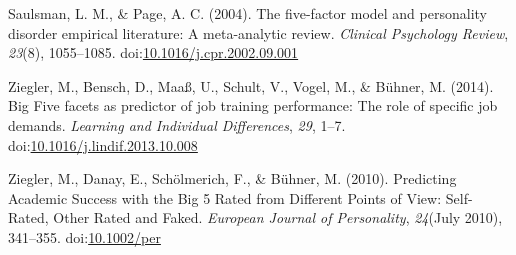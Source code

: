 \documentclass[man]{apa6}
\theoremstyle{definition}
\theoremstyle{definition}
\theoremstyle{definition}
\theoremstyle{remark}
\begin{document}
\leavevmode\hypertarget{ref-SaulsmanPage2004}{}%
Saulsman, L. M., \& Page, A. C. (2004). The five-factor model and
personality disorder empirical literature: A meta-analytic review.
\emph{Clinical Psychology Review}, \emph{23}(8), 1055--1085.
doi:\href{https://doi.org/10.1016/j.cpr.2002.09.001}{10.1016/j.cpr.2002.09.001}

\leavevmode\hypertarget{ref-Ziegler2014}{}%
Ziegler, M., Bensch, D., Maaß, U., Schult, V., Vogel, M., \& Bühner, M.
(2014). Big Five facets as predictor of job training performance: The
role of specific job demands. \emph{Learning and Individual
Differences}, \emph{29}, 1--7.
doi:\href{https://doi.org/10.1016/j.lindif.2013.10.008}{10.1016/j.lindif.2013.10.008}

\leavevmode\hypertarget{ref-Ziegler2010}{}%
Ziegler, M., Danay, E., Schölmerich, F., \& Bühner, M. (2010).
Predicting Academic Success with the Big 5 Rated from Different Points
of View: Self-Rated, Other Rated and Faked. \emph{European Journal of
Personality}, \emph{24}(July 2010), 341--355.
doi:\href{https://doi.org/10.1002/per}{10.1002/per}

\endgroup
\end{document}
